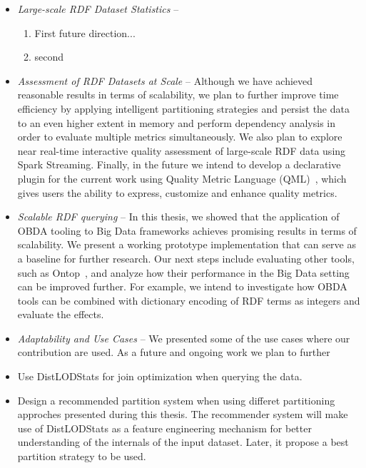 \begin{itemize}
    \item \textit{Large-scale RDF Dataset Statistics} -- 
    \begin{enumerate}
        \item First future direction...
        \item second
    \end{enumerate}
    \item \textit{Assessment of RDF Datasets at Scale} -- 
    Although we have achieved reasonable results in terms of scalability, we plan to further improve time efficiency by applying intelligent partitioning strategies and persist the data to an even higher extent in memory and perform dependency analysis in order to evaluate multiple metrics simultaneously. 
    We also plan to explore near real-time interactive quality assessment of large-scale RDF data using Spark Streaming.
    Finally, in the future we intend to develop a declarative plugin for the current work using Quality Metric Language (QML)~\cite{debattista2016luzzu}, which gives users the ability to express, customize and enhance quality metrics.
    \item \textit{Scalable RDF querying} -- 
    In this thesis, we showed that the application of OBDA tooling to Big Data frameworks achieves promising results in terms of scalability. 
    We present a working prototype implementation that can serve as a baseline for further research. 
    Our next steps include evaluating other tools, such as Ontop~\cite{Calvanese2017OntopAS}, and analyze how their performance in the Big Data setting can be improved further. 
    For example, we intend to investigate how OBDA tools can be combined with dictionary encoding of RDF terms as integers and evaluate the effects.
    \item \textit{Adaptability and Use Cases} -- 
    We presented some of the use cases where our contribution are used. 
    As a future and ongoing work we plan to further 
    \item Use DistLODStats for join optimization when querying the data.
    \item Design a recommended partition system when using differet partitioning approches presented during this thesis.
    The recommender system will make use of DistLODStats as a feature engineering mechanism for better understanding of the internals of the input dataset. 
    Later, it propose a best partition strategy to be used.
\end{itemize}

